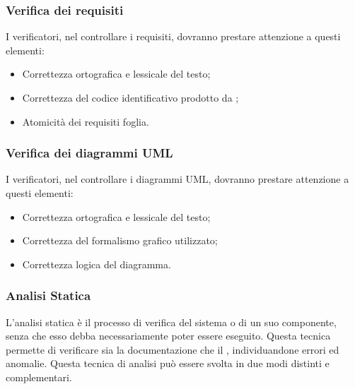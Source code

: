 \subsubsection{Verifica dei requisiti}
I verificatori, nel controllare i requisiti, dovranno prestare attenzione a questi elementi:
\begin{itemize}
\item Correttezza ortografica e lessicale del testo;
\item Correttezza del codice identificativo prodotto da ;
\item Atomicità dei requisiti foglia.
\end{itemize}

\subsubsection{Verifica dei diagrammi UML}
I verificatori, nel controllare i diagrammi UML, dovranno prestare attenzione a
questi elementi:
\begin{itemize}
\item Correttezza ortografica e lessicale del testo;
\item Correttezza del formalismo grafico utilizzato;
\item Correttezza logica del diagramma.
\end{itemize}



\subsubsection{Analisi Statica}
    L'analisi statica è il processo di verifica del sistema o di un suo componente, senza che esso debba necessariamente poter essere eseguito.
    Questa tecnica permette di verificare sia la documentazione che il , individuandone errori ed anomalie. Questa tecnica di analisi può essere svolta in due modi distinti e complementari.
    
